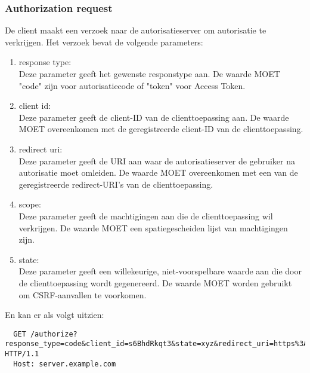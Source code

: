 \subsubsection{Authorization request}%
\label{subsubsec:authorization-request}
De client maakt een verzoek naar de autorisatieserver om autorisatie te verkrijgen. Het verzoek bevat de volgende parameters:
\begin{enumerate}[label=\textbf{-}]
    \item response type: \\
    Deze parameter geeft het gewenste responstype aan. De waarde MOET "code" zijn voor autorisatiecode of "token" voor Access Token.
  
    \item client id: \\
    Deze parameter geeft de client-ID van de clienttoepassing aan. De waarde MOET overeenkomen met de geregistreerde client-ID van de clienttoepassing.
  
    \item redirect uri: \\
    Deze parameter geeft de URI aan waar de autorisatieserver de gebruiker na autorisatie moet omleiden. De waarde MOET overeenkomen met een van de geregistreerde redirect-URI's van de clienttoepassing.
  
    \item scope: \\
    Deze parameter geeft de machtigingen aan die de clienttoepassing wil verkrijgen. De waarde MOET een spatiegescheiden lijst van machtigingen zijn.
  
    \item state: \\
    Deze parameter geeft een willekeurige, niet-voorspelbare waarde aan die door de clienttoepassing wordt gegenereerd. De waarde MOET worden gebruikt om CSRF-aanvallen te voorkomen.
  \end{enumerate}
  En kan er als volgt uitzien:
  \begin{verbatim}
  GET /authorize?response_type=code&client_id=s6BhdRkqt3&state=xyz&redirect_uri=https%3A%2F%2Fclient%2Eexample%2Ecom%2Fcb HTTP/1.1
  Host: server.example.com
  \end{verbatim}

